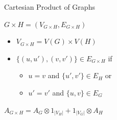 \documentclass{beamer}
\begin{document}
\begin{frame}[t]{Cartesian Product of Graphs}
	\begin{exampleblock}{}
	\setlength\abovedisplayskip{-8pt}
	\begin{center}
		$G \times H = (V_{G\times H},E_{G\times H})$
	\end{center}
	\end{exampleblock}
	\begin{itemize}
		\item $V_{G\times H} = V(G) \times V(H)$
		\item $\{(u,u'),(v,v')\} \in E_{G\times H}$ if 
		\begin{itemize}
			\item $u = v$ and $\{u',v'\} \in E_H$ or
			\item $u' = v'$ and $\{u,v\} \in E_G$
		\end{itemize}
	\end{itemize}
	\begin{exampleblock}{}
	\setlength\abovedisplayskip{-8pt}
	\begin{center}
		$A_{G\times H} = A_G \otimes \text{1}_{\left|V_H\right|} + \text{1}_{\left|V_G\right|} \otimes A_H$
	\end{center}
	\end{exampleblock}
\end{frame}
\end{document}
